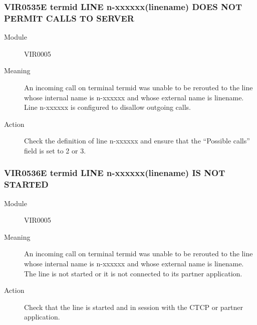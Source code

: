 \documentclass[letterpaper,10pt,english]{sphinxmanual}
\begin{document}
\subsubsection{VIR0535E termid LINE n-xxxxxx(linename) DOES NOT PERMIT CALLS TO SERVER}
\label{\detokenize{messages:vir0535e-termid-line-n-xxxxxx-linename-does-not-permit-calls-to-server}}\begin{description}
\item[{Module}] \leavevmode
VIR0005

\item[{Meaning}] \leavevmode
An incoming call on terminal termid was unable to be rerouted to the line whose internal name is n-xxxxxx and whose external name is linename. Line n-xxxxxx is configured to disallow outgoing calls.

\item[{Action}] \leavevmode
Check the definition of line n-xxxxxx and ensure that the “Possible calls” field is set to 2 or 3.

\end{description}


\subsubsection{VIR0536E termid LINE n-xxxxxx(linename) IS NOT STARTED}
\label{\detokenize{messages:vir0536e-termid-line-n-xxxxxx-linename-is-not-started}}\begin{description}
\item[{Module}] \leavevmode
VIR0005

\item[{Meaning}] \leavevmode
An incoming call on terminal termid was unable to be rerouted to the line whose internal name is n-xxxxxx and whose external name is linename. The line is not started or it is not connected to its partner application.

\item[{Action}] \leavevmode
Check that the line is started and in session with the CTCP or partner application.

\end{description}
\end{document}
